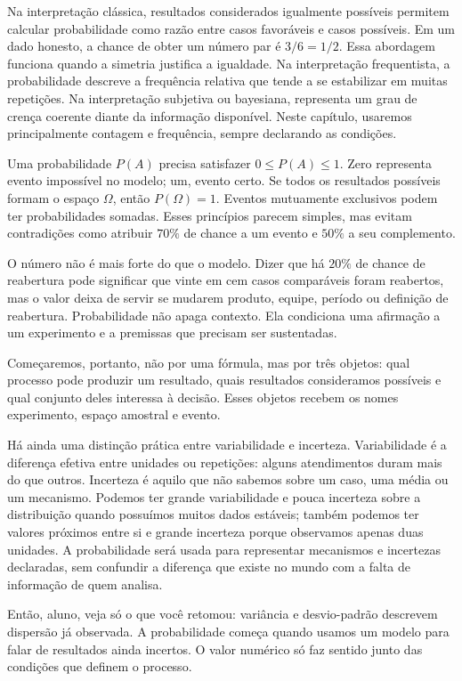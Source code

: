 Na interpretação clássica, resultados considerados igualmente possíveis permitem calcular probabilidade como razão entre casos favoráveis e casos possíveis. Em um dado honesto, a chance de obter um número par é $3/6=1/2$. Essa abordagem funciona quando a simetria justifica a igualdade. Na interpretação frequentista, a probabilidade descreve a frequência relativa que tende a se estabilizar em muitas repetições. Na interpretação subjetiva ou bayesiana, representa um grau de crença coerente diante da informação disponível. Neste capítulo, usaremos principalmente contagem e frequência, sempre declarando as condições.

Uma probabilidade $P(A)$ precisa satisfazer $0\leq P(A)\leq1$. Zero representa evento impossível no modelo; um, evento certo. Se todos os resultados possíveis formam o espaço $\Omega$, então $P(\Omega)=1$. Eventos mutuamente exclusivos podem ter probabilidades somadas. Esses princípios parecem simples, mas evitam contradições como atribuir $70\%$ de chance a um evento e $50\%$ a seu complemento.

O número não é mais forte do que o modelo. Dizer que há $20\%$ de chance de reabertura pode significar que vinte em cem casos comparáveis foram reabertos, mas o valor deixa de servir se mudarem produto, equipe, período ou definição de reabertura. Probabilidade não apaga contexto. Ela condiciona uma afirmação a um experimento e a premissas que precisam ser sustentadas.

Começaremos, portanto, não por uma fórmula, mas por três objetos: qual processo pode produzir um resultado, quais resultados consideramos possíveis e qual conjunto deles interessa à decisão. Esses objetos recebem os nomes experimento, espaço amostral e evento.

Há ainda uma distinção prática entre variabilidade e incerteza. Variabilidade é a diferença efetiva entre unidades ou repetições: alguns atendimentos duram mais do que outros. Incerteza é aquilo que não sabemos sobre um caso, uma média ou um mecanismo. Podemos ter grande variabilidade e pouca incerteza sobre a distribuição quando possuímos muitos dados estáveis; também podemos ter valores próximos entre si e grande incerteza porque observamos apenas duas unidades. A probabilidade será usada para representar mecanismos e incertezas declaradas, sem confundir a diferença que existe no mundo com a falta de informação de quem analisa.

\begin{SummaryBox}
Então, aluno, veja só o que você retomou: variância e desvio-padrão descrevem dispersão já observada. A probabilidade começa quando usamos um modelo para falar de resultados ainda incertos. O valor numérico só faz sentido junto das condições que definem o processo.
\end{SummaryBox}

